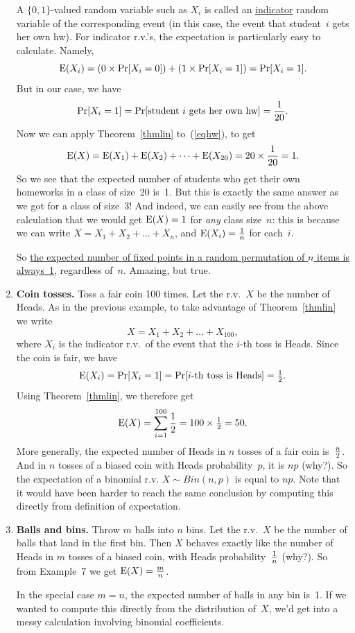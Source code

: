 \documentclass[11pt]{article}
\def\half{{\textstyle{1\over 2}}}
\def\ul#1{\underline{#1}}
\def\Ex#1{{\rm E}(#1)}
\newcounter{thm}
\begin{document}
\begin{enumerate}
A $\{0,1\}$-valued random variable such as $X_i$ is called an
\ul{indicator} random variable of the corresponding event (in
this case, the event that student~$i$ gets her own hw).  For indicator
r.v.'s, the expectation is particularly easy to calculate.  Namely,  $$
   \Ex{X_i}=(0\times\Pr[X_i=0]) + (1\times\Pr[X_i=1]) = \Pr[X_i=1].  $$
But in our case, we have $$
   \Pr[X_i=1] = \Pr[\hbox{\rm student $i$ gets her own hw}] = {1\over{20}}.$$
Now we can apply Theorem~\ref{thmlin} to~(\ref{eqhw}), to get $$
   \Ex{X}=\Ex{X_1}+\Ex{X_2}+\cdots+\Ex{X_{20}}=20\times{1\over{20}} = 1.  $$
So we see that the expected number of students who get their own
homeworks in a class of size~20 is~1.  But this is exactly the same
answer as we got for a class of size~3!  And indeed, we can easily
see from the above calculation that we would get $\Ex{X}=1$ for
{\it any\/} class size~$n$: this is because we can write
$X=X_1+X_2+\ldots+X_n$, and $\Ex{X_i}={1\over n}$ for each~$i$.

So \ul{the expected number of fixed points in a random permutation
of $n$ items is always~1}, regardless of~$n$.  Amazing, but true.
\item {\bf Coin tosses.}  Toss a fair coin 100 times.
Let the r.v.~$X$ be the number of Heads.  As in the previous
example, to take advantage of Theorem~\ref{thmlin} we write $$
   X=X_1+X_2+\ldots+X_{100},  $$
where $X_i$ is the indicator r.v.\ of the event that the $i$-th toss
is Heads.  Since the coin is fair, we have $$
   \Ex{X_i}=\Pr[X_i=1]=\Pr[\hbox{\rm $i$-th toss is Heads}]=\half.  $$
Using Theorem~\ref{thmlin}, we therefore get $$
  \Ex{X} = \sum_{i=1}^{100} \frac{1}{2}= 100\times\half = 50.  $$
More generally, the expected number of Heads in $n$ tosses of a fair
coin is~$n\over 2$.  And in $n$ tosses of a biased coin with Heads
probability~$p$, it is $np$ (why?). So the expectation of a binomial r.v. $X \sim Bin(n,p)$ is equal to $np$.
Note that it would have been harder to reach the same conclusion by computing this directly from definition of expectation.
\item {\bf Balls and bins.}  Throw $m$ balls into $n$ bins.  Let
the r.v.~$X$ be the number of balls that land in the first bin.
Then $X$ behaves exactly like the number of Heads in $m$ tosses of
a biased coin, with Heads probability~$1\over n$ (why?).  So from
Example~7 we get $\Ex{X}={m\over n}$.

In the special case $m=n$, the expected number of balls in any bin
is~1.  If we wanted to compute this directly from the distribution
of~$X$, we'd get into a messy calculation involving binomial coefficients.


\end{enumerate}
\end{document}
